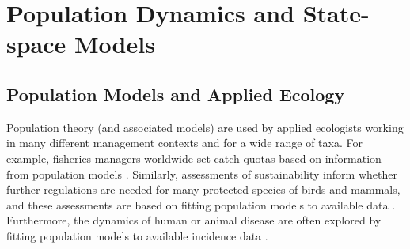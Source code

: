 \chapter{Population Dynamics and State-space Models}\label{chp:state_space}

\section{Population Models and Applied Ecology} \label{sec:Chap3_Gompertz}

Population theory (and associated models) are used by applied ecologists working in many different management contexts and for a wide range of taxa.  For example, fisheries managers worldwide set catch quotas based on information from population models \cite{melnychuk_fisheries_2017}.  Similarly, assessments of sustainability inform whether further regulations are needed for many protected species of birds and mammals, and these assessments are based on fitting population models to available data \cite{kery_integrated_2021}.  Furthermore, the dynamics of human or animal disease are often explored by fitting population models to available incidence data \cite{ram_modified_2021}.  

